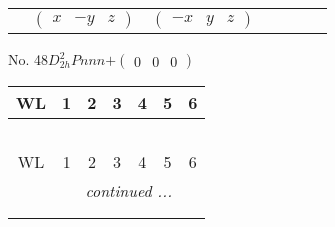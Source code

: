 \documentclass[fleqn,9pt,landscape]{jsarticle}
\begin{document}
\begin{center}
\begin{longtable}{ccccccc}
& $ \begin{pmatrix} x & - y & z \end{pmatrix} $ & $ \begin{pmatrix} - x & y & z \end{pmatrix} $ & $  $ & $  $ & $  $ & $  $ \\
\end{longtable}
\end{center}
\newpage
No. 48\quad$D_{2h}^{2}$\quad$Pnnn$\quad[ orthorhombic ]\quad$+\begin{pmatrix} 0 & 0 & 0 \end{pmatrix}$
\begin{center}
\renewcommand{\arraystretch}{1.2}
\begin{longtable}{ccccccc}
 \hline \hline
WL & 1 & 2 & 3 & 4 & 5 & 6 \\ \hline \endfirsthead

\multicolumn{6}{l}{\tablename\ \thetable{}} \\
 \hline \hline
WL & 1 & 2 & 3 & 4 & 5 & 6 \\ \hline \endhead

 \hline \hline
\multicolumn{6}{r}{\footnotesize\it continued ...} \\ \endfoot

 \hline \hline
\multicolumn{6}{r}{} \\ \endlastfoot


\end{longtable}
\end{center}
\end{document}
